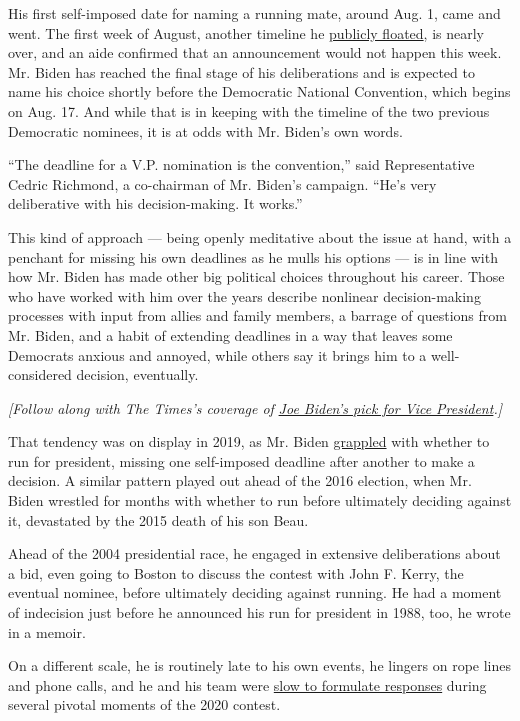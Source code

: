 His first self-imposed date for naming a running mate, around Aug. 1,
came and went. The first week of August, another timeline he
\href{https://www.nytimes.com/2020/07/28/us/politics/joe-biden-racial-justice-economy-plan.html}{publicly
floated}, is nearly over, and an aide confirmed that an announcement
would not happen this week. Mr. Biden has reached the final stage of his
deliberations and is expected to name his choice shortly before the
Democratic National Convention, which begins on Aug. 17. And while that
is in keeping with the timeline of the two previous Democratic nominees,
it is at odds with Mr. Biden's own words.

``The deadline for a V.P. nomination is the convention,'' said
Representative Cedric Richmond, a co-chairman of Mr. Biden's campaign.
``He's very deliberative with his decision-making. It works.''

This kind of approach --- being openly meditative about the issue at
hand, with a penchant for missing his own deadlines as he mulls his
options --- is in line with how Mr. Biden has made other big political
choices throughout his career. Those who have worked with him over the
years describe nonlinear decision-making processes with input from
allies and family members, a barrage of questions from Mr. Biden, and a
habit of extending deadlines in a way that leaves some Democrats anxious
and annoyed, while others say it brings him to a well-considered
decision, eventually.

\emph{{[}Follow along with The Times's coverage of}
\href{https://www.nytimes.com/news-event/biden-vice-president}{\emph{Joe
Biden's pick for Vice President}}\emph{.{]}}

That tendency was on display in 2019, as Mr. Biden
\href{https://www.nytimes.com/2019/03/07/us/politics/biden-2020.html}{grappled}
with whether to run for president, missing one self-imposed deadline
after another to make a decision. A similar pattern played out ahead of
the 2016 election, when Mr. Biden wrestled for months with whether to
run before ultimately deciding against it, devastated by the 2015 death
of his son Beau.

Ahead of the 2004 presidential race, he engaged in extensive
deliberations about a bid, even going to Boston to discuss the contest
with John F. Kerry, the eventual nominee, before ultimately deciding
against running. He had a moment of indecision just before he announced
his run for president in 1988, too, he wrote in a memoir.

On a different scale, he is routinely late to his own events, he lingers
on rope lines and phone calls, and he and his team were
\href{https://www.nytimes.com/2019/10/05/us/politics/biden-trump-ukraine.html}{slow
to formulate responses} during several pivotal moments of the 2020
contest.

